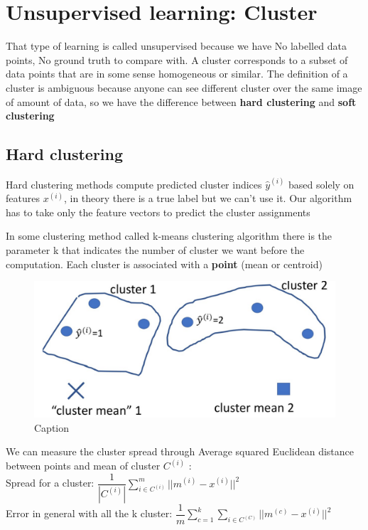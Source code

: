 \chapter{Unsupervised learning: Cluster}
That type of learning is called unsupervised because we have No labelled data points, No ground truth to compare with. A cluster corresponds to a subset of data points that are in some sense homogeneous or similar. The definition of a cluster is ambiguous because anyone can see different cluster over the same image of amount of data, so we have the difference between \textbf{hard clustering} and \textbf{soft clustering}
\section{Hard clustering}

Hard clustering methods compute predicted cluster indices $\hat{y}^{(i)}$ based solely on features $x^{(i)}$, in theory there is a true label but we can't use it.
Our algorithm has to take only the feature vectors to predict the cluster assignments

In some clustering method called k-means clustering algorithm there is the parameter k that indicates the number of cluster we want before the computation. Each cluster is associated with a \textbf{point} (mean or centroid)
\begin{figure}[H]
    \centering
    \includegraphics[scale=0.3]{images/CL/CL1.png}
    \caption{Caption}
    \label{fig:enter-label}
\end{figure}

We can measure the cluster spread through Average squared Euclidean distance between points and mean of cluster $ C^{(i)}$ :\\
Spread for a cluster: $ \dfrac{1}{|C^{(i)}|}  \sum\limits_{i\in C^{(i)}}^m || m^{(i)} - x^{(i)}||^2$ \\
Error in general with all the k cluster: $ \dfrac{1}{m} \sum\limits_{c=1}^k \sum\limits_{i \in C^{(C)}} || m^{(c)} - x^{(i)}||^2$

